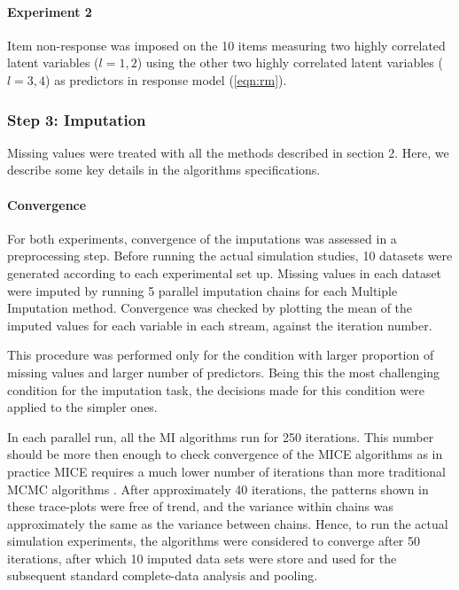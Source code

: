 	\paragraph{Experiment 2}
	Item non-response was imposed on the 10 items measuring two highly correlated latent variables ($l = 1, 2$) 
	using the other two highly correlated latent variables ($l = 3, 4$) as predictors in response model (\ref{eqn:rm}). 

\subsubsection{Step 3: Imputation}
	
	Missing values were treated with all the methods described in section 2.
	Here, we describe some key details in the algorithms specifications.

	\paragraph{Convergence}

	For both experiments, convergence of the imputations was assessed in a preprocessing step.
	Before running the actual simulation studies, 10 datasets were generated according to each experimental set up.
	Missing values in each dataset were imputed by running 5 parallel imputation chains for each Multiple Imputation 
	method.
	Convergence was checked by plotting the mean of the imputed values for each variable in each stream, against the 
	iteration number.

	This procedure was performed only for the condition with larger proportion of missing values and larger number of 
	predictors.
	Being this the most challenging condition for the imputation task, the decisions made for this condition were
	applied to the simpler ones.

	In each parallel run, all the MI algorithms run for 250 iterations.
	This number should be more then enough to check convergence of the MICE algorithms as in practice MICE requires 
	a much lower number of iterations than more traditional MCMC algorithms \citep[p. 126]{vanBuuren:2018}.
	After approximately 40 iterations, the patterns shown in these trace-plots were free of trend, and the variance 
	within chains was approximately the same as the variance between chains.
	Hence, to run the actual simulation experiments, the algorithms were considered to converge after 50 iterations, 
	after which 10 imputed data sets were store and used for the subsequent standard complete-data analysis and 
	pooling.

